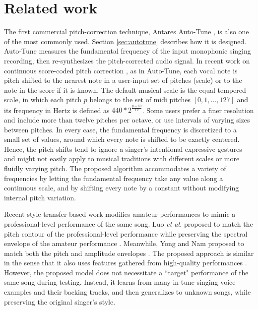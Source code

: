 \section{Related work}
The first commercial pitch-correction technique, Antares Auto-Tune \cite{antares:2016}, is also one of the most commonly used. Section \ref{sec:autotune} describes how it is designed. Auto-Tune measures the fundamental frequency of the input monophonic singing recording, then re-synthesizes the pitch-corrected audio signal. In recent work on continuous score-coded pitch correction \cite{salazar2015continuous}, as in Auto-Tune, each vocal note is pitch shifted to the nearest note in a user-input set of pitches (scale) or to the note in the score if it is known. The default musical scale is the equal-tempered scale, in which each pitch $p$ belongs to the set of \gls{midi} pitches $[0, 1, ..., 127]$ and its frequency in Hertz is defined as $440*2^{\frac{p-69}{12}}$. Some users prefer a finer resolution and include more than twelve pitches per octave, or use intervals of varying sizes between pitches. In every case, the fundamental frequency is discretized to a small set of values, around which every note is shifted to be exactly centered. Hence, the pitch shifts tend to ignore a singer's intentional expressive gestures and might not easily apply to musical traditions with different scales or more fluidly varying pitch. The proposed algorithm accommodates a variety of frequencies by letting the fundamental frequency take any value along a continuous scale, and by shifting every note by a constant without modifying internal pitch variation.

Recent style-transfer-based work modifies amateur performances to mimic a professional-level performance of the same song. Luo \textit{et al.} proposed to match the pitch contour of the professional-level performance while preserving the spectral envelope of the amateur performance \cite{luo2018singing}. Meanwhile, Yong and Nam proposed to match both the pitch and amplitude envelopes \cite{yong2018singing}. The proposed approach is similar in the sense that it also uses features gathered from high-quality performances \cite{wager2018intonation}. However, the proposed model does not necessitate a ``target" performance of the same song during testing. Instead, it learns from many in-tune singing voice examples and their backing tracks, and then generalizes to unknown songs, while preserving the original singer's style.


